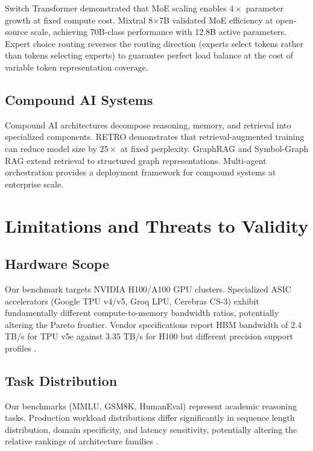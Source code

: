 \documentclass{article}
\begin{document}
Switch Transformer \cite{arxiv_2412_06333} demonstrated that MoE scaling enables $4\times$ parameter growth at fixed compute cost. Mixtral 8$\times$7B \cite{arxiv_2412_06333} validated MoE efficiency at open-source scale, achieving 70B-class performance with 12.8B active parameters. Expert choice routing \cite{arxiv_2404_01131} reverses the routing direction (experts select tokens rather than tokens selecting experts) to guarantee perfect load balance at the cost of variable token representation coverage.


\subsection{Compound AI Systems}


Compound AI architectures \cite{arxiv_2406_00584} decompose reasoning, memory, and retrieval into specialized components. RETRO \cite{arxiv_2310_09270} demonstrates that retrieval-augmented training can reduce model size by $25\times$ at fixed perplexity. GraphRAG \cite{arxiv_2501_14050} and Symbol-Graph RAG extend retrieval to structured graph representations. Multi-agent orchestration \cite{arxiv_2404_01131,crossref_10_1109_access_2026_3656309} provides a deployment framework for compound systems at enterprise scale.




\section{Limitations and Threats to Validity}



\subsection{Hardware Scope}


Our benchmark targets NVIDIA H100/A100 GPU clusters. Specialized ASIC accelerators (Google TPU v4/v5, Groq LPU, Cerebras CS-3) exhibit fundamentally different compute-to-memory bandwidth ratios, potentially altering the Pareto frontier. Vendor specifications report HBM bandwidth of 2.4 TB/s for TPU v5e against 3.35 TB/s for H100 but different precision support profiles \cite{pubmed_42380865}.


\subsection{Task Distribution}


Our benchmarks (MMLU, GSM8K, HumanEval) represent academic reasoning tasks. Production workload distributions differ significantly in sequence length distribution, domain specificity, and latency sensitivity, potentially altering the relative rankings of architecture families \cite{doaj_001772c2113c476d9d5d40452c8e10e1}.
\end{document}
